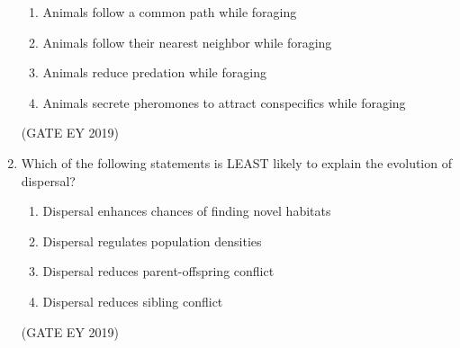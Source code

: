 \documentclass[journal,12pt,onecolumn]{IEEEtran}
\theoremstyle{remark}
\begin{document}
\begin{enumerate}[resume]
\begin{enumerate}
\item Animals follow a common path while foraging 
\item Animals follow their nearest neighbor while foraging   
\item Animals reduce predation while foraging   
\item Animals secrete pheromones to attract conspecifics while foraging 
  
\end{enumerate}

 

\hfill{(GATE EY 2019)}
\item Which of the following statements is LEAST likely to explain the evolution of dispersal?  

\begin{enumerate}
 
\item Dispersal enhances chances of finding novel habitats 
\item  Dispersal regulates population densities
\item  Dispersal reduces parent-offspring conflict   
\item Dispersal reduces sibling conflict 

\end{enumerate}


\hfill{(GATE EY 2019)}
\end{enumerate}
\end{document}
